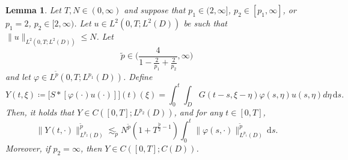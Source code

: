 \documentclass[10pt,a4paper]{amsart}
\newtheorem{lemma}[theorem]{Lemma}
\numberwithin{equation}{section}
\newcommand{\ceqq}{\coloneqq}
\newcommand{\dd}{\,\mathrm{d}}
\begin{document}
\begin{lemma} 
\label{lem:det conv}
Let $T,N\in(0,\infty)$  and suppose that  
$p_1\in(2,\infty]$, $p_2\in[p_1,\infty]$, or  $p_1=2$,  $p_2 \in [2,\infty)$.   
Let $u\in L^2(0,T;L^2(D))$ be such that $\|u\|_{L^2(0,T;L^2(D))}\leq N$. Let 
\begin{equation}\label{eq:cond tilde p}
    \tilde p\in\Big(\frac{4}{1-\frac{2}{p_1}+\frac{2}{p_2}},\infty\Big)
\end{equation}
and let $\varphi\in L^{\tilde p}(0,T;L^{p_1}(D))$. 
Define 
\[
Y(t,\xi)\ceqq \big[S*[\varphi(\cdot)u(\cdot)]\big](t)(\xi)=\int_0^t \int_{D} G(t-s,\xi-\eta)\varphi(s,\eta)u(s,\eta)d\eta \dd s.\]
Then, it holds that $Y\in C([0,T];L^{p_2}(D))$,   and for any   $t\in [0,T]$,
\[
\|Y(t,\cdot)\|_{L^{p_2}(D)}^{\tilde p}  \lesssim_{{\tilde p}} N^{{\tilde p}}(1+T^{\frac{\tilde p}{2}-1})\int_0^t\|\varphi(s,\cdot)\|_{L^{p_1}(D)}^{{\tilde p}}\dd s.
\]
Moreover, if $p_2=\infty$, then $Y\in C([0,T];C(D))$. 
\end{lemma}  
\end{document}
